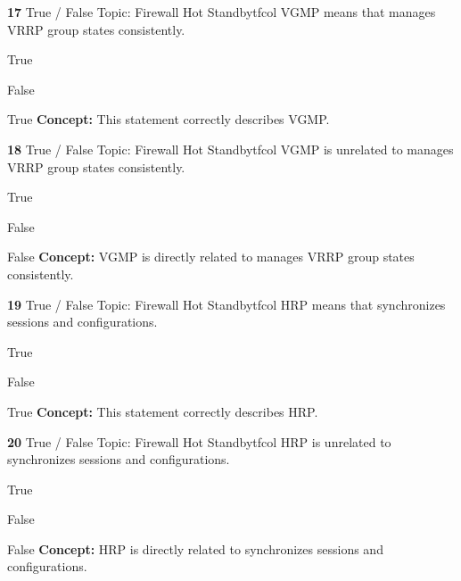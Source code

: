 \documentclass[10pt,a4paper]{article}
\begin{document}
\begin{qcard}{\color{white}\textbf{17} \hfill \small True / False \textbar{} Topic: Firewall Hot Standby}{tfcol}
VGMP means that manages VRRP group states consistently.

\begin{qoptions}
\item True
\item False
\end{qoptions}
\begin{explainbox}{True}
\textbf{Concept:} This statement correctly describes VGMP.
\end{explainbox}
\end{qcard}

\begin{qcard}{\color{white}\textbf{18} \hfill \small True / False \textbar{} Topic: Firewall Hot Standby}{tfcol}
VGMP is unrelated to manages VRRP group states consistently.

\begin{qoptions}
\item True
\item False
\end{qoptions}
\begin{explainbox}{False}
\textbf{Concept:} VGMP is directly related to manages VRRP group states consistently.
\end{explainbox}
\end{qcard}

\begin{qcard}{\color{white}\textbf{19} \hfill \small True / False \textbar{} Topic: Firewall Hot Standby}{tfcol}
HRP means that synchronizes sessions and configurations.

\begin{qoptions}
\item True
\item False
\end{qoptions}
\begin{explainbox}{True}
\textbf{Concept:} This statement correctly describes HRP.
\end{explainbox}
\end{qcard}

\begin{qcard}{\color{white}\textbf{20} \hfill \small True / False \textbar{} Topic: Firewall Hot Standby}{tfcol}
HRP is unrelated to synchronizes sessions and configurations.

\begin{qoptions}
\item True
\item False
\end{qoptions}
\begin{explainbox}{False}
\textbf{Concept:} HRP is directly related to synchronizes sessions and configurations.
\end{explainbox}
\end{qcard}
\end{document}
